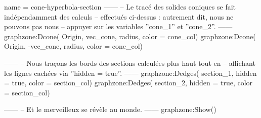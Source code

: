 \documentclass[border = 3pt]{standalone}
\begin{document}
\begin{luadraw}{name = cone-hyperbola-section}
------
-- Le tracé des solides coniques se fait indépendamment des calculs
-- effectués ci-dessus : autrement dit, nous ne pouvons pas nous
-- appuyer sur les variables ''cone_1'' et ''cone_2''.
------
    graphzone:Dcone(
        Origin, vec_cone, radius,
        {color = cone_col})
    graphzone:Dcone(
        Origin, -vec_cone, radius,
        {color = cone_col})

------
-- Nous traçons les bords des sections calculées plus haut tout en
-- affichant les lignes cachées via ''hidden = true''.
------
    graphzone:Dedges(
        section_1,
        {hidden = true, color = section_col})
    graphzone:Dedges(
        section_2,
        {hidden = true, color = section_col})

------
-- Et le merveilleux se révèle au monde.
------
    graphzone:Show()
\end{luadraw}
\end{document}
